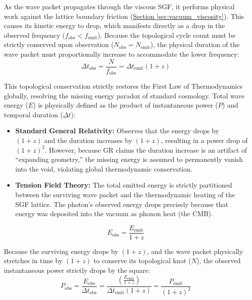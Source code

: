 As the wave packet propagates through the viscous SGF, it performs physical work against the lattice boundary friction (\hyperref[sec:vacuum_viscosity]{Section \ref*{sec:vacuum_viscosity}}). This causes its kinetic energy to drop, which manifests directly as a drop in the observed frequency ($f_{\text{obs}} < f_{\text{emit}}$). Because the topological cycle count must be strictly conserved upon observation ($N_{\text{obs}} = N_{\text{emit}}$), the physical duration of the wave packet must proportionally increase to accommodate the lower frequency:
\begin{equation}
    \Delta t_{\text{obs}} = \frac{N}{f_{\text{obs}}} = \Delta t_{\text{emit}} (1+z)
\end{equation}

This topological conservation strictly restores the First Law of Thermodynamics globally, resolving the missing energy paradox of standard cosmology. Total wave energy ($E$) is physically defined as the product of instantaneous power ($P$) and temporal duration ($\Delta t$):

\begin{itemize}
    \item \textbf{Standard General Relativity:} Observes that the energy drops by $(1+z)$ and the duration increases by $(1+z)$, resulting in a power drop of $(1+z)^2$. However, because GR claims the duration increase is an artifact of ``expanding geometry,'' the missing energy is assumed to permanently vanish into the void, violating global thermodynamic conservation.
    \item \textbf{Tension Field Theory:} The total emitted energy is strictly partitioned between the surviving wave packet and the thermodynamic heating of the SGF lattice. The photon's observed energy drops precisely because that energy was deposited into the vacuum as phonon heat (the CMB).
\end{itemize}

\begin{equation}
    E_{\text{obs}} = \frac{E_{\text{emit}}}{1+z}
\end{equation}

Because the surviving energy drops by $(1+z)$, and the wave packet physically stretches in time by $(1+z)$ to conserve its topological knot ($N$), the observed instantaneous power strictly drops by the square:
\begin{equation}
    P_{\text{obs}} = \frac{E_{\text{obs}}}{\Delta t_{\text{obs}}} = \frac{\left( \frac{E_{\text{emit}}}{1+z} \right)}{\Delta t_{\text{emit}} (1+z)} = \frac{P_{\text{emit}}}{(1+z)^2}
\end{equation}


